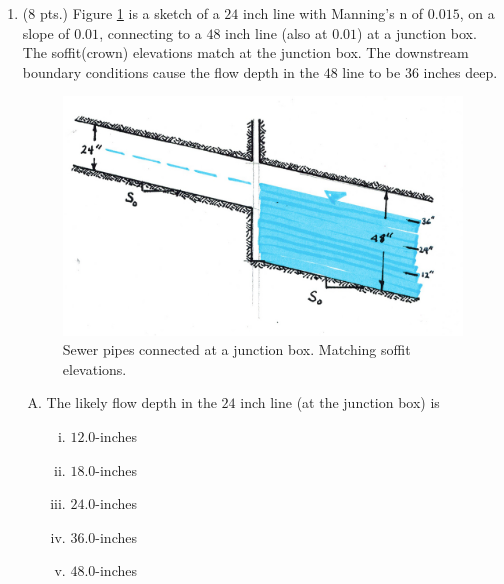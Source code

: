 \documentclass[11pt]{article}
\begin{document}
\begin{enumerate}
\clearpage
\item (8 pts.)
Figure \ref{fig:SewerPipeMatchSoffit} is a sketch of a $24$ inch line with Manning's n of $0.015$, on a slope of $0.01$, connecting to a $48$ inch line (also at $0.01$) at a junction box.   The soffit(crown) elevations match at the junction box.  The downstream boundary conditions cause the flow depth in the $48$ line to be $36$ inches deep.

\begin{figure}[h!] %
\centering
   \includegraphics[width=4.8in]{SewerPipeMatchSoffit.jpg}
   \caption{Sewer pipes connected at a junction box.  Matching soffit elevations.}
   \label{fig:SewerPipeMatchSoffit} 
\end{figure}

\begin{enumerate}[(A)]
\item The likely flow depth in the $24$ inch line (at the junction box) is
\begin{enumerate} [i)]
\item $12.0$-inches 
\item $18.0$-inches 
\item $24.0$-inches 
\item $36.0$-inches
\item $48.0$-inches
\end{enumerate} 


\end{enumerate}
\end{enumerate}
\end{document}
